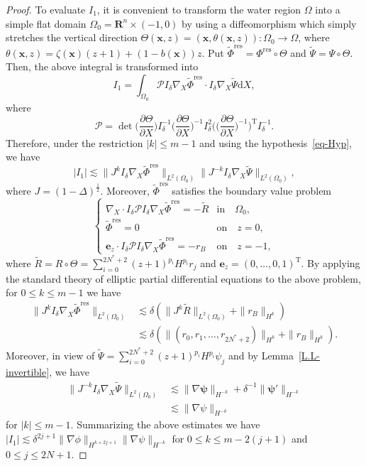\documentclass[11pt,leqno]{article}
\numberwithin{equation}{section}
\numberwithin{figure}{section}
\begin{document}
\begin{proof}
To evaluate $I_1$, it is convenient to transform the water region $\Omega$ into a simple flat domain 
$\Omega_0=\mathbf{R}^n\times(-1,0)$ by using a diffeomorphism which simply stretches the vertical direction 
$\Theta(\bm{x},z)=(\bm{x},\theta(\bm{x},z)) \colon \Omega_0\to\Omega$, 
where $\theta(\bm{x},z)=\zeta(\bm{x})(z+1)+(1-b(\bm{x}))z$. 
Put $\tilde{\Phi}^\mathrm{res}=\Phi^\mathrm{res}\circ\Theta$ and $\tilde{\Psi}=\Psi\circ\Theta$. 
Then, the above integral is transformed into 
%
\[
I_1 = \int_{\Omega_0} \mathcal{P}I_\delta\nabla_X\tilde{\Phi}^\mathrm{res} \cdot I_\delta\nabla_X\tilde{\Psi} \mathrm{d}X,
\]
%
where 
%
\[
\mathcal{P}
= \det\biggl( \frac{\partial\Theta}{\partial X} \biggr)I_\delta^{-1}\biggl( \frac{\partial\Theta}{\partial X} \biggr)^{-1}
 I_\delta^2\biggl( \biggl( \frac{\partial\Theta}{\partial X} \biggr)^{-1} \biggr)^\mathrm{T}I_\delta^{-1}.
\]
%
Therefore, under the restriction $|k|\leq m-1$ and using the hypothesis~\eqref{eq-Hyp}, we have 
%
\[
|I_1| \lesssim \|J^k I_\delta\nabla_X\tilde{\Phi}^\mathrm{res}\|_{L^2(\Omega_0)}
 \|J^{-k} I_\delta\nabla_X\tilde{\Psi}\|_{L^2(\Omega_0)},
\]
%
where $J=(1-\Delta)^\frac12$. 
Moreover, $\tilde{\Phi}^\mathrm{res}$ satisfies the boundary value problem 
%
\[
\begin{cases}
\nabla_X\cdot I_\delta\mathcal{P}I_\delta\nabla_X\tilde{\Phi}^\mathrm{res} = -\tilde{R} & \mbox{in}\quad \Omega_0, \\
\tilde{\Phi}^\mathrm{res} = 0 & \mbox{on}\quad z=0, \\
\bm{e}_z\cdot I_\delta\mathcal{P}I_\delta\nabla_X\tilde{\Phi}^\mathrm{res} = -r_B & \mbox{on}\quad z=-1,
\end{cases}
\]
%
where $\tilde{R} = R\circ\Theta = \sum_{i=0}^{2N^*+2}(z+1)^{p_i}H^{p_i}r_j$ and $\bm{e}_z=(0,\ldots,0,1)^\mathrm{T}$. 
By applying the standard theory of elliptic partial differential equations to the above problem, 
for $0\leq k\leq m-1$ we have 
%
\begin{align*}
\|J^k I_\delta\nabla_X\tilde{\Phi}^\mathrm{res}\|_{L^2(\Omega_0)}
&\lesssim \delta (\|J^k\tilde{R}\|_{L^2(\Omega_0)}+\|r_B\|_{H^k}) \\
&\lesssim \delta (\|(r_0,r_1,\ldots,r_{2N^*+2})\|_{H^k}+\|r_B\|_{H^k}).
\end{align*}
%
Moreover, in view of $\tilde{\Psi}=\sum_{i=0}^{2N^*+2}(z+1)^{p_i}H^{p_i}\psi_j$ and by Lemma~\ref{L.L-invertible}, we have 
%
\begin{align*}
\|J^{-k} I_\delta\nabla_X\tilde{\Psi}\|_{L^2(\Omega_0)}
&\lesssim \|\nabla\bm{\psi}\|_{H^{-k}}+\delta^{-1}\|\bm{\psi}'\|_{H^{-k}} \\
&\lesssim \|\nabla\psi\|_{H^{-k}}
\end{align*}
%
for $|k|\leq m-1$. 
Summarizing the above estimates we have $|I_1| \lesssim \delta^{2j+1}\|\nabla\phi\|_{H^{k+2j+1}}\|\nabla\psi\|_{H^{-k}}$ 
for $0\leq k\leq m-2(j+1)$ and $0\leq j\leq 2N+1$. 



\end{proof}
\end{document}
